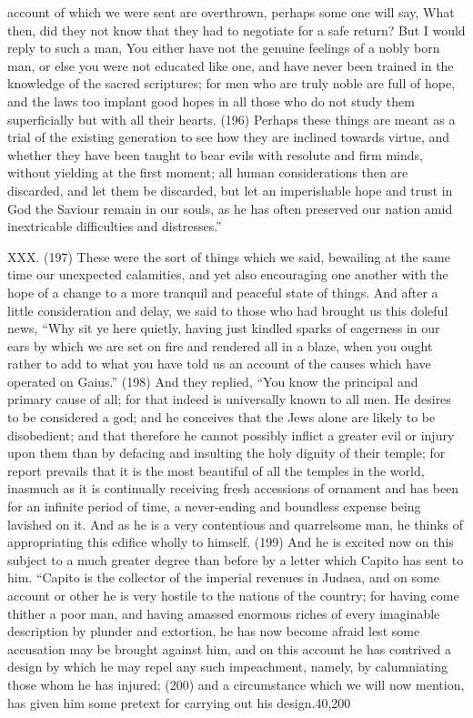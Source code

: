 account of which we were sent are overthrown, perhaps some one will say, What then, did they not
know that they had to negotiate for a safe return? But I would reply to such a man, You either have
not the genuine feelings of a nobly born man, or else you were not educated like one, and have
never been trained in the knowledge of the sacred scriptures; for men who are truly noble are full
of hope, and the laws too implant good hopes in all those who do not study them superficially but
with all their hearts. (196) Perhaps these things are meant as a trial of the existing generation to
see how they are inclined towards virtue, and whether they have been taught to bear evils with
resolute and firm minds, without yielding at the first moment; all human considerations then are
discarded, and let them be discarded, but let an imperishable hope and trust in God the Saviour
remain in our souls, as he has often preserved our nation amid inextricable difficulties and
distresses.''

XXX. (197) These were the sort of things which we said, bewailing at the same time our
unexpected calamities, and yet also encouraging one another with the hope of a change to a more
tranquil and peaceful state of things. And after a little consideration and delay, we said to those
who had brought us this doleful news, ``Why sit ye here quietly, having just kindled sparks of
eagerness in our ears by which we are set on fire and rendered all in a blaze, when you ought
rather to add to what you have told us an account of the causes which have operated on Gaius.''
(198) And they replied, ``You know the principal and primary cause of all; for that indeed is
universally known to all men. He desires to be considered a god; and he conceives that the Jews
alone are likely to be disobedient; and that therefore he cannot possibly inflict a greater evil or
injury upon them than by defacing and insulting the holy dignity of their temple; for report prevails
that it is the most beautiful of all the temples in the world, inasmuch as it is continually receiving
fresh accessions of ornament and has been for an infinite period of time, a never-ending and
boundless expense being lavished on it. And as he is a very contentious and quarrelsome man, he
thinks of appropriating this edifice wholly to himself. (199) And he is excited now on this subject to
a much greater degree than before by a letter which Capito has sent to him. ``Capito is the collector
of the imperial revenues in Judaea, and on some account or other he is very hostile to the nations
of the country; for having come thither a poor man, and having amassed enormous riches of every
imaginable description by plunder and extortion, he has now become afraid lest some accusation
may be brought against him, and on this account he has contrived a design by which he may repel
any such impeachment, namely, by calumniating those whom he has injured; (200) and a
circumstance which we will now mention, has given him some pretext for carrying out his
design.40,200

